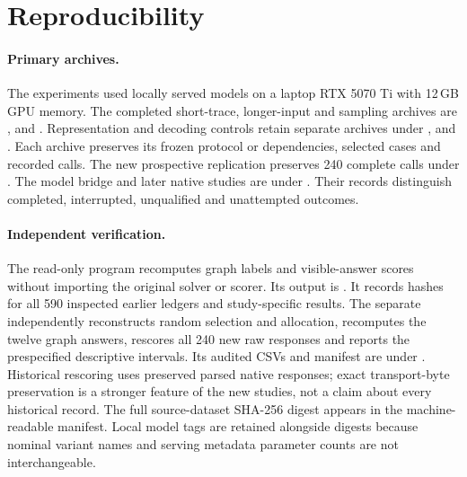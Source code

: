 \documentclass[10pt]{article}
\begin{document}




\appendix






\section{Reproducibility}
\paragraph{Primary archives.} The experiments used locally served models on a laptop RTX 5070 Ti with 12\,GB GPU memory. The completed short-trace, longer-input and sampling archives are \protect{}, \protect{} and \protect{}. Representation and decoding controls retain separate archives under \protect{}, \protect{} and \protect{}. Each archive preserves its frozen protocol or dependencies, selected cases and recorded calls. The new prospective replication preserves 240 complete calls under \protect{}. The model bridge and later native studies are under \protect{}. Their records distinguish completed, interrupted, unqualified and unattempted outcomes.

\paragraph{Independent verification.} The read-only program \protect{} recomputes graph labels and visible-answer scores without importing the original solver or scorer. Its output is \protect{}. It records hashes for all 590 inspected earlier ledgers and study-specific results. The separate \protect{} independently reconstructs random selection and allocation, recomputes the twelve graph answers, rescores all 240 new raw responses and reports the prespecified descriptive intervals. Its audited CSVs and manifest are under \protect{}. Historical rescoring uses preserved parsed native responses; exact transport-byte preservation is a stronger feature of the new studies, not a claim about every historical record. The full source-dataset SHA-256 digest appears in the machine-readable manifest. Local model tags are retained alongside digests because nominal variant names and serving metadata parameter counts are not interchangeable.
\end{document}
